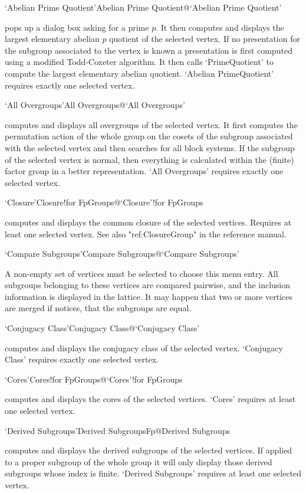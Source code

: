 \>`Abelian Prime Quotient'{Abelian Prime Quotient}@{`Abelian Prime Quotient'}

pops  up a dialog  box asking  for a  prime  $p$.  It  then computes  and
displays the largest elementary   abelian  $p$ quotient of  the  selected
vertex.  If no presentation for the  subgroup associated to the vertex is
known   a presentation is  first computed  using  a modified Todd-Coxeter
algorithm.     It then calls    `PrimeQuotient' to   compute  the largest
elementary abelian quotient.  `Abelian PrimeQuotient' requires exactly one
selected vertex. 

\>`All Overgroups'{All Overgroups}@{`All Overgroups'}

computes and   displays all overgroups   of the selected vertex.   It first
computes the permutation  action of the whole group  on  the cosets of  the
subgroup  associated with  the selected vertex  and then  searches for  all
block  systems. If the   subgroup of the   selected vertex is  normal, then
everything is   calculated within the  (finite) factor  group in   a better
representation. `All Overgroups' requires exactly one selected vertex.

\>`Closure'{Closure!for FpGroups}@{`Closure'!for FpGroups}

computes and displays the common closure of the selected vertices.
Requires at least one selected vertex. See also "ref:ClosureGroup" in the
{\GAP} reference manual.

\>`Compare Subgroups'{Compare Subgroups}@{`Compare Subgroups'}

A non-empty set of vertices must be selected to choose this menu entry. All
subgroups belonging to these vertices are compared pairwise, and the inclusion
information is displayed in the lattice. It may happen that two or more
vertices are merged if {\GAP} notices, that the subgroups are
equal. 

\>`Conjugacy Class'{Conjugacy Class}@{`Conjugacy Class'}

computes and  displays  the   conjugacy  class of  the   selected vertex.
`Conjugacy Class' requires  exactly  one selected vertex.  

\>`Cores'{Cores!for FpGroups}@{`Cores'!for FpGroups}

computes and  displays the cores  of the selected vertices.   `Cores'
requires at least one selected vertex.

\>`Derived Subgroups'{Derived SubgroupsFp}@{Derived Subgroups}

computes and displays the derived subgroups of  the selected vertices. 
If applied   to a proper subgroup  of   the whole group it   will only
display  those derived  subgroups  whose  index is  finite.   `Derived
Subgroups' requires at least one selected vertex.

